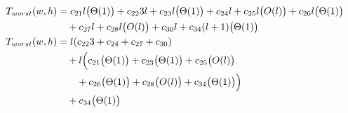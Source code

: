 \begin{subequations}
\label{eq:linedetection-hirzer-quaddetection}
\begin{align}
\label{eq:linedetection-hirzer-quaddetection-1}
T_{worst}(w,h)& =
c_{21}l\bigl(\Theta(1)\bigr)
+ c_{22}3l
+ c_{23}l\bigl(\Theta(1)\bigr)
+ c_{24}l
+ c_{25}l\bigl(O(l)\bigr)
+ c_{26}l\bigl(\Theta(1)\bigr)
\\
& \quad
+ c_{27}l
+ c_{28}l\bigl(O(l)\bigr)
+ c_{30}l
+ c_{34}(l + 1)\bigl(\Theta(1)\bigr)
\nonumber \\
\label{eq:linedetection-hirzer-quaddetection-2}
T_{worst}(w,h)& =
l(c_{22}3 + c_{24} + c_{27} + c_{30})
\\
& \quad
+ l\Bigl(c_{21}\bigl(\Theta(1)\bigr) + c_{23}\bigl(\Theta(1)\bigr) + c_{25}\bigl(O(l)\bigr)
\nonumber \\
& \quad \quad
 + c_{26}\bigl(\Theta(1)\bigr) + c_{28}\bigl(O(l)\bigr) + c_{34}\bigl(\Theta(1)\bigr)\Bigr)
\nonumber \\
& \quad
+ c_{34}\bigl(\Theta(1)\bigr)
\nonumber
\end{align}
\end{subequations}
